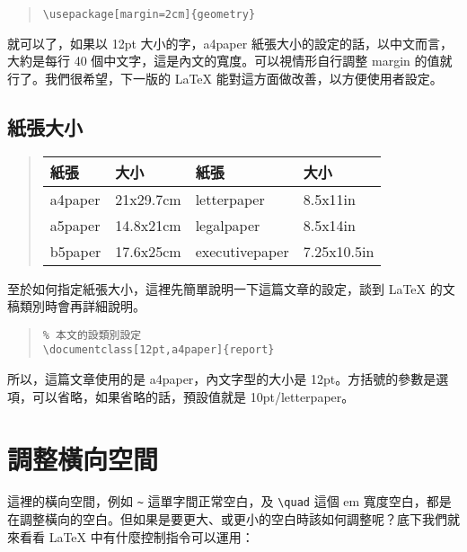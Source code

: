 \begin{quote}
   \begin{verbatim}
\usepackage[margin=2cm]{geometry}
\end{verbatim}
\end{quote}

就可以了，如果以 12pt 大小的字，{\ttfamily a4paper} 紙張大小的設定的話，以中文而言，大約是每行 40 個中文字，這是內文的寬度。可以視情形自行調整 {\ttfamily margin} 的值就行了。我們很希望，下一版的 \LaTeX{} 能對這方面做改善，以方便使用者設定。

\subsection{紙張大小}

\begin{quote}
   \begin{tabular}{>{\ttfamily}ll>{\ttfamily }ll}
      紙張    & 大小      & 紙張           & 大小        \\
      \hline
      a4paper & 21x29.7cm & letterpaper    & 8.5x11in    \\
      a5paper & 14.8x21cm & legalpaper     & 8.5x14in    \\
      b5paper & 17.6x25cm & executivepaper & 7.25x10.5in \\
   \end{tabular}
\end{quote}

至於如何指定紙張大小，這裡先簡單說明一下這篇文章的設定，談到 \LaTeX{} 的文稿類別時會再詳細說明。

\begin{quote}
   \begin{verbatim}
% 本文的設類別設定
\documentclass[12pt,a4paper]{report}
\end{verbatim}
\end{quote}

所以，這篇文章使用的是 {\ttfamily a4paper}，內文字型的大小是 12pt。方括號的參數是選項，可以省略，如果省略的話，預設值就是 10pt/{\ttfamily letterpaper}。

\section{調整橫向空間}

這裡的橫向空間，例如 \verb|~| 這單字間正常空白，及 \verb|\quad| 這個 em 寬度空白，都是在調整橫向的空白。但如果是要更大、或更小的空白時該如何調整呢？底下我們就來看看 \LaTeX{} 中有什麼控制指令可以運用：

